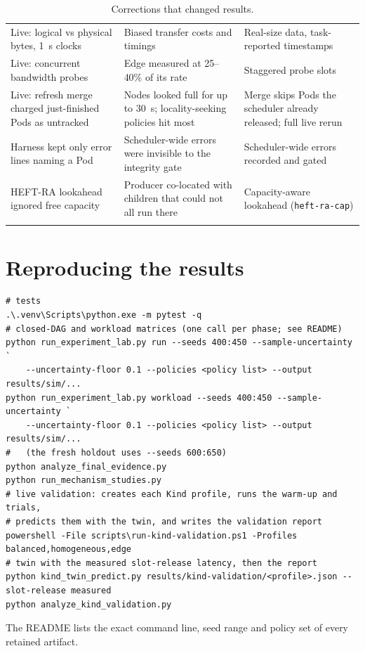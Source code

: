 \documentclass[12pt,a4paper]{report}
\begin{document}
\begin{longtable}{L{4.2cm}L{4.6cm}L{4.8cm}}
Live: logical vs physical bytes, 1~s clocks & Biased transfer costs and timings & Real-size data, task-reported timestamps \\
Live: concurrent bandwidth probes & Edge measured at 25--40\% of its rate & Staggered probe slots \\
Live: refresh merge charged just-finished Pods as untracked & Nodes looked full for up to 30~s; locality-seeking policies hit most & Merge skips Pods the scheduler already released; full live rerun \\
Harness kept only error lines naming a Pod & Scheduler-wide errors were invisible to the integrity gate & Scheduler-wide errors recorded and gated \\
HEFT-RA lookahead ignored free capacity & Producer co-located with children that could not all run there & Capacity-aware lookahead (\texttt{heft-ra-cap}) \\
\bottomrule
\caption{Corrections that changed results.}
\label{tab:corrections}
\end{longtable}

\chapter{Reproducing the results}
\label{app:repro}

\begin{lstlisting}[language={},caption={Main entry points (PowerShell, repository root).}]
# tests
.\.venv\Scripts\python.exe -m pytest -q
# closed-DAG and workload matrices (one call per phase; see README)
python run_experiment_lab.py run --seeds 400:450 --sample-uncertainty `
    --uncertainty-floor 0.1 --policies <policy list> --output results/sim/...
python run_experiment_lab.py workload --seeds 400:450 --sample-uncertainty `
    --uncertainty-floor 0.1 --policies <policy list> --output results/sim/...
#   (the fresh holdout uses --seeds 600:650)
python analyze_final_evidence.py
python run_mechanism_studies.py
# live validation: creates each Kind profile, runs the warm-up and trials,
# predicts them with the twin, and writes the validation report
powershell -File scripts\run-kind-validation.ps1 -Profiles balanced,homogeneous,edge
# twin with the measured slot-release latency, then the report
python kind_twin_predict.py results/kind-validation/<profile>.json --slot-release measured
python analyze_kind_validation.py
\end{lstlisting}

The README lists the exact command line, seed range and policy set of
every retained artifact.
\end{document}
